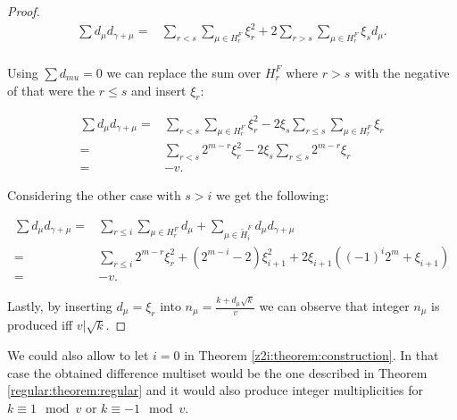 \begin{proof}
    \begin{equation}
        \begin{split}
            \sum d_\mu d_{\gamma+\mu}
              = & \sum\limits_{r<s} \sum\limits_{\mu \in H_r^F} \xi_r^2
                + 2\sum\limits_{r>s} \sum\limits_{\mu \in H_r^F} \xi_s d_\mu. \\
        \end{split}
    \end{equation}
    
    Using $\sum d_{mu} = 0$ we can replace the sum over $H_r^F$ where $r > s$ with the negative of that were the $r \leq s$ and insert $\xi_r$:
    
    \begin{equation}
        \begin{split}
            \sum d_\mu d_{\gamma+\mu}
              = & \sum\limits_{r<s} \sum\limits_{\mu \in H_r^F} \xi_r^2
                - 2 \xi_s \sum\limits_{r \leq s} \sum\limits_{\mu \in H_r^F} \xi_r \\
              = & \sum\limits_{r<s} 2^{m-r} \xi_r^2
                - 2 \xi_s \sum\limits_{r \leq s}  2^{m-r} \xi_r \\
              = & - v.
        \end{split}
    \end{equation}
    
    Considering the other case with $s > i$ we get the following:
    
    \begin{equation}
        \begin{split}
            \sum d_\mu d_{\gamma+\mu}
              = & \sum\limits_{r \leq i} \sum\limits_{\mu \in H_r^F} d_\mu
                + \sum\limits_{\mu \in \widetilde H_i^F} d_\mu d_{\gamma + \mu} \\
              = & \sum\limits_{r\leq i} 2^{m-r} \xi_r^2
                + (2^{m-i}-2) \xi_{i+1}^2 + 2\xi_{i+1}((-1)^i 2^m + \xi_{i+1}) \\
              = & -v.
        \end{split}
    \end{equation}
    
    Lastly, by inserting $d_\mu = \xi_r$ into $n_\mu=\frac{k+d_\mu \sqrt k}v$ we can observe that integer $n_\mu$ is produced iff $v | \sqrt k$.
\end{proof}

\begin{remark}
    We could also allow to let $i=0$ in Theorem \ref{z2i:theorem:construction}. In that case the obtained difference multiset would be the one described in 
Theorem \ref{regular:theorem:regular} and it would also produce  integer multiplicities for $k \equiv 1 \mod v$ or $k \equiv -1 \mod v$.
\end{remark}

